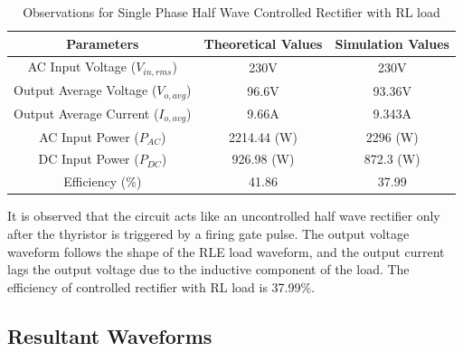 \begin{table}[h]
    \renewcommand{\arraystretch}{1.3}
    \label{table_observation_single-phase-half-wave-controlled-rectifier-with-RL-load}
    \centering
    \begin{tabular}{|c|c|c|}
        \hline
        Parameters                              & Theoretical Values & Simulation Values \\
        \hline
        \hline
        AC Input Voltage ($ V_{in,rms} $)       & 230V               & 230V              \\
        \hline
        Output Average Voltage ($ V_{o,avg} $)  & 96.6V              & 93.36V            \\
        \hline
        Output Average Current ($ I_{o,avg}  $) & 9.66A              & 9.343A            \\
        \hline
        AC Input Power ($ P_{AC}  $)            & 2214.44 (W)        & 2296 (W)          \\
        \hline
        DC Input Power ($ P_{DC}  $)            & 926.98 (W)         & 872.3 (W)         \\
        \hline
        Efficiency (\%)                         & 41.86              & 37.99             \\
        \hline
    \end{tabular}
    \caption{Observations for Single Phase Half Wave Controlled Rectifier with RL load}

\end{table}


It is observed that the circuit acts like an uncontrolled half wave rectifier only after the thyristor is triggered by a firing gate pulse. The output voltage waveform follows the shape of the RLE load waveform, and the output current lags the output voltage due to the inductive component of the load.
The efficiency of controlled rectifier with RL load is 37.99\%.



\subsection{Resultant Waveforms}

